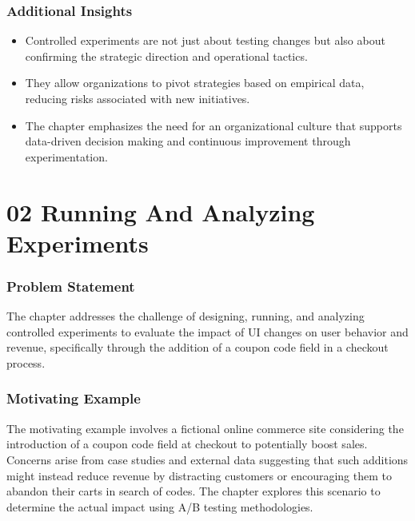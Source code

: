 \documentclass{article}
\begin{document}
\subsubsection*{Additional Insights}
\begin{itemize}
    \item Controlled experiments are not just about testing changes but also about confirming the strategic direction and operational tactics.
    \item They allow organizations to pivot strategies based on empirical data, reducing risks associated with new initiatives.
    \item The chapter emphasizes the need for an organizational culture that supports data-driven decision making and continuous improvement through experimentation.
\end{itemize}

\section*{02 Running And Analyzing Experiments}
\subsubsection*{Problem Statement}
The chapter addresses the challenge of designing, running, and analyzing controlled experiments to evaluate the impact of UI changes on user behavior and revenue, specifically through the addition of a coupon code field in a checkout process.

\subsubsection*{Motivating Example}
The motivating example involves a fictional online commerce site considering the introduction of a coupon code field at checkout to potentially boost sales. Concerns arise from case studies and external data suggesting that such additions might instead reduce revenue by distracting customers or encouraging them to abandon their carts in search of codes. The chapter explores this scenario to determine the actual impact using A/B testing methodologies.
\end{document}
